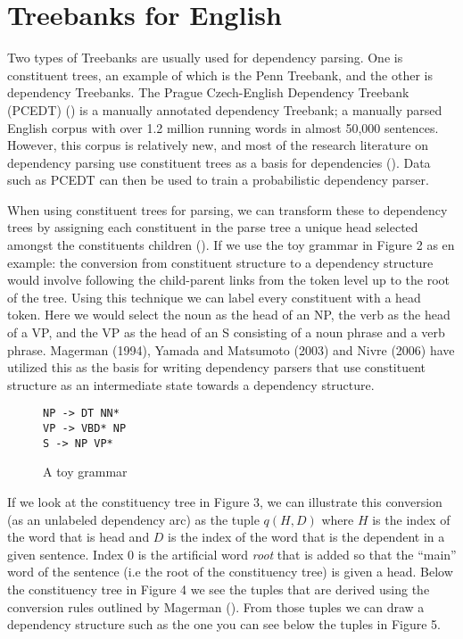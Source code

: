 \documentclass[10pt]{article}
\begin{document}

\section{Treebanks for English}
Two types of Treebanks are usually used for dependency parsing. One is constituent trees, an example of which is the Penn Treebank, and the other is dependency Treebanks. The Prague Czech-English Dependency Treebank (PCEDT) (\cite{prague-dependency-treebank-3.0}) is a manually annotated dependency Treebank; a manually parsed English corpus with over 1.2 million running words in almost 50,000 sentences. However, this corpus is relatively new, and most of the research literature on dependency parsing use constituent trees as a basis for dependencies (\cite{johansson2007extended}). Data such as PCEDT can then be used to train a probabilistic dependency parser. 

When using constituent trees for parsing, we can transform these to dependency trees by assigning each constituent in the parse tree a unique head selected amongst the constituents children (\cite{magerman1994natural}). If we use the toy grammar in Figure 2 as en example: the conversion from constituent structure to a dependency structure would involve following the child-parent links from the token level up to the root of the tree. Using this technique we can label every constituent with a head token. Here we would select the noun as the head of an NP, the verb as the head of a VP, and the VP as the head of an S consisting of a noun phrase and a verb phrase. Magerman (1994), Yamada and Matsumoto (2003) and Nivre (2006) have utilized this as the basis for writing dependency parsers that use constituent structure as an intermediate state towards a dependency structure.

\begin{figure}
\begin{lstlisting}
NP -> DT NN*
VP -> VBD* NP
S -> NP VP*
\end{lstlisting}
\caption{A toy grammar}
\end{figure}

If we look at the constituency tree in Figure 3, we can illustrate this conversion (as an unlabeled dependency arc) as the tuple $q(H, D)$ where $H$ is the index of the word that is head and $D$ is the index of the word that is the dependent in a given sentence. Index 0 is the artificial word \textit{root} that is added so that the ``main'' word of the sentence (i.e the root of the constituency tree) is given a head. Below the constituency tree in Figure 4 we see the tuples that are derived using the conversion rules outlined by Magerman (\cite{magerman1994natural}). From those tuples we can draw a dependency structure such as the one you can see below the tuples in Figure 5. 
\end{document}
